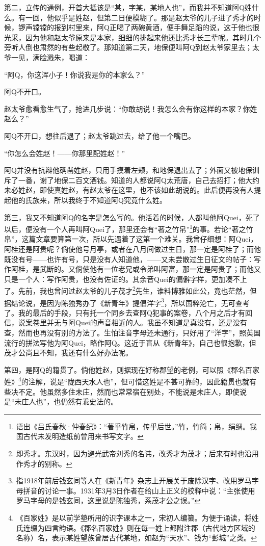 \documentclass[12pt,UTF8]{ctexbook}
\begin{document}
第二，立传的通例，开首大抵该是“某，字某，某地人也”，而我并不知道阿Q姓什么。有一回，他似乎是姓赵，但第二日便模糊了。那是赵太爷的儿子进了秀才的时候，锣声镗镗的报到村里来，阿Q正喝了两碗黄酒，便手舞足蹈的说，这于他也很光采，因为他和赵太爷原来是本家，细细的排起来他还比秀才长三辈呢。其时几个旁听人倒也肃然的有些起敬了。那知道第二天，地保便叫阿Q到赵太爷家里去；太爷一见，满脸溅朱，喝道：

“阿Q，你这浑小子！你说我是你的本家么？”

阿Q不开口。

赵太爷愈看愈生气了，抢进几步说：“你敢胡说！我怎么会有你这样的本家？你姓赵么？”

阿Q不开口，想往后退了；赵太爷跳过去，给了他一个嘴巴。

“你怎么会姓赵！——你那里配姓赵！”

阿Q并没有抗辩他确凿姓赵，只用手摸着左颊，和地保退出去了；外面又被地保训斥了一番，谢了地保二百文酒钱。知道的人都说阿Q太荒唐，自己去招打；他大约未必姓赵，即使真姓赵，有赵太爷在这里，也不该如此胡说的。此后便再没有人提起他的氏族来，所以我终于不知道阿Q究竟什么姓。

第三，我又不知道阿Q的名字是怎么写的。他活着的时候，人都叫他阿Quei，死了以后，便没有一个人再叫阿Quei了，那里还会有“著之竹帛”\footnote{语出《吕氏春秋·仲春纪》：“著乎竹帛，传乎后世。”竹，竹简；帛，绢绸。我国古代未发明造纸前曾用来书写文字。}的事。若论“著之竹帛”，这篇文章要算第一次，所以先遇着了这第一个难关。我曾仔细想：阿Quei，阿桂还是阿贵呢？倘使他号月亭，或者在八月间做过生日，那一定是阿桂了；而他既没有号——也许有号，只是没有人知道他，——又未尝散过生日征文的帖子：写作阿桂，是武断的。又倘使他有一位老兄或令弟叫阿富，那一定是阿贵了；而他又只是一个人：写作阿贵，也没有佐证的。其余音Quei的偏僻字样，更加凑不上了。先前，我也曾问过赵太爷的儿子茂才\footnote{即秀才。东汉时，因为避光武帝刘秀的名讳，改秀才为茂才；后来有时也沿用作秀才的别称。}先生，谁料博雅如此公，竟也茫然，但据结论说，是因为陈独秀办了《新青年》提倡洋字\footnote{指1918年前后钱玄同等人在《新青年》杂志上开展关于废除汉字、改用罗马字母拼音的讨论一事。1931年3月3日作者在给山上正义的校释中说：“主张使用罗马字母的是钱玄同，这里说是陈独秀，系茂才公之误。”}，所以国粹沦亡，无可查考了。我的最后的手段，只有托一个同乡去查阿Q犯事的案卷，八个月之后才有回信，说案卷里并无与阿Quei的声音相近的人。我虽不知道是真没有，还是没有查，然而也再没有别的方法了。生怕注音字母还未通行，只好用了“洋字”，照英国流行的拼法写他为阿Quei，略作阿Q。这近于盲从《新青年》，自己也很抱歉，但茂才公尚且不知，我还有什么好办法呢。

第四，是阿Q的籍贯了。倘他姓赵，则据现在好称郡望的老例，可以照《郡名百家姓》\footnote{《百家姓》是以前学塾所用的识字课本之一，宋初人编纂。为便于诵读，将姓氏连缀为四言韵语。《郡名百家姓》则在每一姓上都附注郡（古代地方区域的名称）名，表示某姓望族曾居古代某地，如赵为“天水”、钱为“彭城”之类。}的注解，说是“陇西天水人也”，但可惜这姓是不甚可靠的，因此籍贯也就有些决不定。他虽然多住未庄，然而也常常宿在别处，不能说是未庄人，即使说是“未庄人也”，也仍然有乖史法的。
\end{document}
